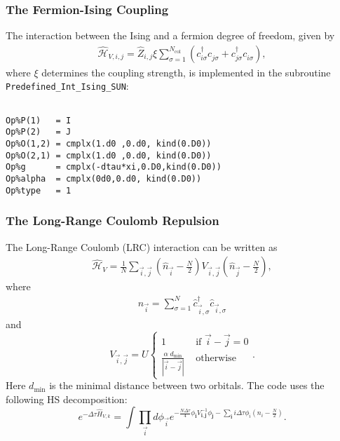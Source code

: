 \subsubsection{The Fermion-Ising Coupling}

The interaction between the Ising and a fermion degree of freedom, given by
\begin{align}
\hat{\mathcal{H}}_{V,i,j} =
\hat{Z}_{i,j} \xi  \sum_{\sigma=1}^{N_\mathrm{col}}\left( c^{\dagger}_{i \sigma} c^{\phantom\dagger}_{j \sigma} + c^{\dagger}_{j \sigma} c^{\phantom\dagger}_{i \sigma} \right),
\end{align} 
where $\xi$ determines the coupling strength, is implemented in the subroutine \texttt{Predefined\_Int\_Ising\_SUN}:
\begin{lstlisting}[style=fortran]

Op%P(1)   = I
Op%P(2)   = J
Op%O(1,2) = cmplx(1.d0 ,0.d0, kind(0.D0)) 
Op%O(2,1) = cmplx(1.d0 ,0.d0, kind(0.D0)) 
Op%g      = cmplx(-dtau*xi,0.D0,kind(0.D0))
Op%alpha  = cmplx(0d0,0.d0, kind(0.D0)) 
Op%type   = 1

\end{lstlisting}



\subsubsection{The Long-Range Coulomb Repulsion}

The Long-Range Coulomb (LRC) interaction can be written as
\begin{align}
\hat{\mathcal{H}}_{V} =
\frac{1} { N } \sum_{\vec{i},\vec{j}}  \left(  \hat{n}_{\vec{i}} -  \frac{N}{2}  \right)  V_{\vec{i},\vec{j}} \left(  \hat{n}_{\vec{j}} -  \frac{N}{2}  \right), 
\end{align} 
where
\begin{align}
\hat{n}_{\vec{i}} = \sum_{\sigma=1}^{N}  \hat{c}^{\dagger}_{\vec{i},\sigma}  \hat{c}^{}_{\vec{i},\sigma}
\end{align} 
and
\begin{equation}
V_{\vec{i}, \vec{j}}   =   U \left\{
\begin{array}{ll}  
1          &   \text{ if } \vec{i} - \vec{j}    = 0 \\
\frac{\alpha   \;   d_\mathrm{min}}{ |   \vec{i} - \vec{j} | } &     \text{ otherwise }
\end{array}
\right. .
\end{equation}
Here $d_\mathrm{min}$ is the minimal distance between two orbitals.     The code uses the following  HS decomposition:
\begin{equation}
e^{-\Delta \tau \hat{H}_{V,k} }  =  \int \prod_{\vec{i}} d \phi_{\vec{i}}   e^{ - \frac{N \Delta \tau} {4} \phi_{\pmb{i}} V^{-1}_{\pmb{i},\pmb{j}}  \phi_{\pmb{j}} - \sum_{\pmb{i}}  i \Delta \tau \phi_i \left( n_{i} - \frac{N}{2} \right) }.
\end{equation}

